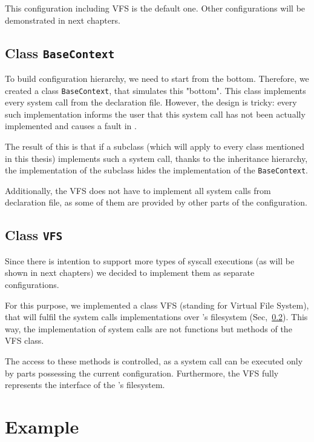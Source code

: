 This configuration including VFS is the default one. Other configurations will be demonstrated in next chapters.

\subsection{Class \texttt{BaseContext}} \label{sec:impl:basecontext}

To build configuration hierarchy, we need to start from the bottom. Therefore, we created a class \texttt{BaseContext}, that simulates this "bottom". This class implements every system call from the declaration file. However, the design is tricky: every such implementation informs the user that this system call has not been actually implemented and causes a fault in \dios. 

The result of this is that if a subclass (which will apply to every class mentioned in this thesis) implements such a system call, thanks to the inheritance hierarchy, the implementation of the subclass hides the implementation of the \texttt{BaseContext}.

Additionally, the VFS does not have to implement all system calls from declaration file, as some of them are provided by other parts of the configuration. 

\subsection{ Class \texttt{VFS} } \label{sec:impl:vfs}

Since there is intention to support more types of syscall executions (as will be shown in next chapters) we decided to implement them as separate configurations. 

 For this purpose, we implemented a class VFS (standing for Virtual File System), that will fulfil the system calls implementations over \divine's filesystem (Sec,~\ref{sec:impl:vfs}). This way, the implementation of system calls are not functions but methods of the VFS class. 
 
The access to these methods is controlled, as a system call can be executed only by parts possessing the current configuration. Furthermore, the VFS fully represents the interface of the \divine's filesystem.


\section{Example} \label{sec:impl:example}

